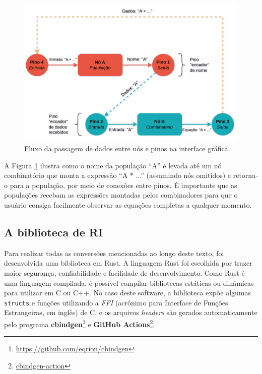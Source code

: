 \documentclass[
	12pt,				%
	openright,			%
	oneside,			%
	a4paper,			%
	main=brazil,
	english,			%
	]{ufsj-abntex2}
\begin{document}
\begin{figure}[h]
    \centering
    \includegraphics[scale=0.175]{imgs/fluxo_dados_gui.png} 
    \caption{Fluxo da passagem de dados entre nós e pinos na interface gráfica.}
    \label{fig::fluxo_dados_gui}
\end{figure}

A Figura \ref{fig::fluxo_dados_gui} ilustra como o nome da população ``A'' é levada até um nó combinatório que monta a expressão ``A * ...'' (assumindo nós omitidos) e retorna-o para a população, por meio de conexões entre pinos. É importante que as populações recebam as expressões montadas pelos combinadores para que o usuário consiga facilmente observar as equações completas a qualquer momento.

\subsection{A biblioteca de RI}
\label{subsec:biblioteca_RI}

Para realizar todas as conversões mencionadas ao longo deste texto, foi desenvolvida uma biblioteca em Rust. A linguagem Rust foi escolhida por trazer maior segurança, confiabilidade e facilidade de desenvolvimento. Como Rust é uma linguagem compilada, é possível compilar bibliotecas estáticas ou dinâmicas para utilizar em C ou C++. No caso deste software, a biblioteca expõe algumas \texttt{structs} e funções utilizando a \textit{FFI} (acrônimo para Interface de Funções Estrangeiras, em inglês) de C, e os arquivos \textit{headers} são gerados automaticamente pelo programa \textbf{cbindgen}\footnote{\href{https://github.com/eqrion/cbindgen}{https://github.com/eqrion/cbindgen}} e \textbf{GitHub Actions}\footnote{\href{https://github.com/marketplace/actions/cbindgen-action}{cbindgen-action}}.
\end{document}
